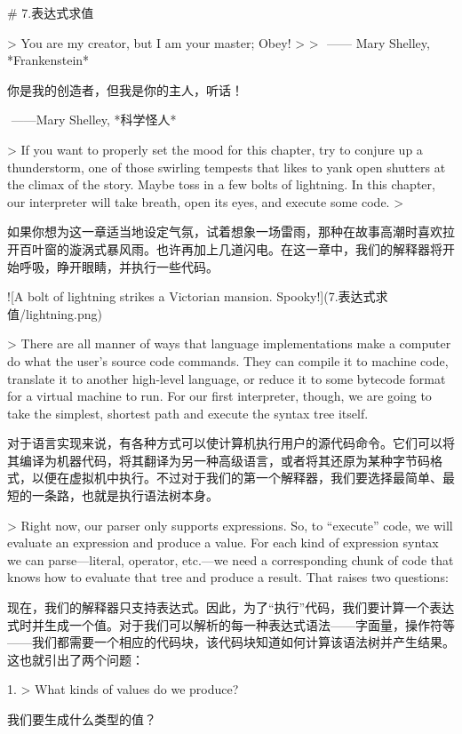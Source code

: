 \documentclass[cn,11pt,chinese]{elegantbook}
\begin{document}
# 7.表达式求值

> You are my creator, but I am your master; Obey!
>
> ​																														——  Mary Shelley, *Frankenstein*

你是我的创造者，但我是你的主人，听话！

​																																	——Mary Shelley, *科学怪人*

> If you want to properly set the mood for this chapter, try to conjure up a thunderstorm, one of those swirling tempests that likes to yank open shutters at the climax of the story. Maybe toss in a few bolts of lightning. In this chapter, our interpreter will take breath, open its eyes, and execute some code.
>

如果你想为这一章适当地设定气氛，试着想象一场雷雨，那种在故事高潮时喜欢拉开百叶窗的漩涡式暴风雨。也许再加上几道闪电。在这一章中，我们的解释器将开始呼吸，睁开眼睛，并执行一些代码。

![A bolt of lightning strikes a Victorian mansion. Spooky!](7.表达式求值/lightning.png)

> There are all manner of ways that language implementations make a computer do what the user’s source code commands. They can compile it to machine code, translate it to another high-level language, or reduce it to some bytecode format for a virtual machine to run. For our first interpreter, though, we are going to take the simplest, shortest path and execute the syntax tree itself.

对于语言实现来说，有各种方式可以使计算机执行用户的源代码命令。它们可以将其编译为机器代码，将其翻译为另一种高级语言，或者将其还原为某种字节码格式，以便在虚拟机中执行。不过对于我们的第一个解释器，我们要选择最简单、最短的一条路，也就是执行语法树本身。

> Right now, our parser only supports expressions. So, to “execute” code, we will evaluate an expression and produce a value. For each kind of expression syntax we can parse—literal, operator, etc.—we need a corresponding chunk of code that knows how to evaluate that tree and produce a result. That raises two questions:

现在，我们的解释器只支持表达式。因此，为了“执行”代码，我们要计算一个表达式时并生成一个值。对于我们可以解析的每一种表达式语法——字面量，操作符等——我们都需要一个相应的代码块，该代码块知道如何计算该语法树并产生结果。这也就引出了两个问题：

1. > What kinds of values do we produce?

   我们要生成什么类型的值？
\end{document}
